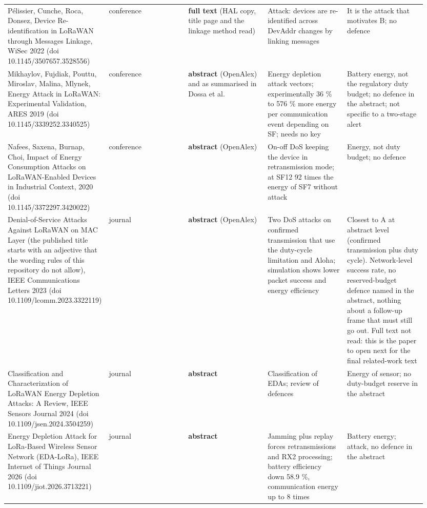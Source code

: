 {\begin{longtable}{p{0.190\linewidth}p{0.190\linewidth}p{0.190\linewidth}p{0.190\linewidth}p{0.190\linewidth}}
P\'elissier, Cunche, Roca, Donsez, Device Re-identification in LoRaWAN through Messages Linkage, WiSec 2022 (doi 10.1145/3507657.3528556) & conference & \textbf{full text} (HAL copy, title page and the linkage method read) & Attack: devices are re-identified across DevAddr changes by linking messages & It is the attack that motivates B; no defence \\
Mikhaylov, Fujdiak, Pouttu, Miroslav, Malina, Mlynek, Energy Attack in LoRaWAN: Experimental Validation, ARES 2019 (doi 10.1145/3339252.3340525) & conference & \textbf{abstract} (OpenAlex) and as summarised in Dossa et al. & Energy depletion attack vectors; experimentally 36 \% to 576 \% more energy per communication event depending on SF; needs no key & Battery energy, not the regulatory duty budget; no defence in the abstract; not specific to a two-stage alert \\
Nafees, Saxena, Burnap, Choi, Impact of Energy Consumption Attacks on LoRaWAN-Enabled Devices in Industrial Context, 2020 (doi 10.1145/3372297.3420022) & conference & \textbf{abstract} (OpenAlex) & On-off DoS keeping the device in retransmission mode; at SF12 92 times the energy of SF7 without attack & Energy, not duty budget; no defence \\
Denial-of-Service Attacks Against LoRaWAN on MAC Layer (the published title starts with an adjective that the wording rules of this repository do not allow), IEEE Communications Letters 2023 (doi 10.1109/lcomm.2023.3322119) & journal & \textbf{abstract} (OpenAlex) & Two DoS attacks on confirmed transmission that use the duty-cycle limitation and Aloha; simulation shows lower packet success and energy efficiency & Closest to A at abstract level (confirmed transmission plus duty cycle). Network-level success rate, no reserved-budget defence named in the abstract, nothing about a follow-up frame that must still go out. Full text not read: this is the paper to open next for the final related-work text \\
Classification and Characterization of LoRaWAN Energy Depletion Attacks: A Review, IEEE Sensors Journal 2024 (doi 10.1109/jsen.2024.3504259) & journal & \textbf{abstract} & Classification of EDAs; review of defences & Energy of sensor; no duty-budget reserve in the abstract \\
Energy Depletion Attack for LoRa-Based Wireless Sensor Network (EDA-LoRa), IEEE Internet of Things Journal 2026 (doi 10.1109/jiot.2026.3713221) & journal & \textbf{abstract} & Jamming plus replay forces retransmissions and RX2 processing; battery efficiency down 58.9 \%, communication energy up to 8 times & Battery energy; attack, no defence in the abstract \\

\end{longtable}}
